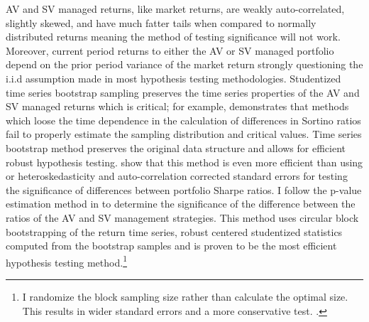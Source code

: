 AV and SV managed returns, like market returns, are weakly auto-correlated, slightly skewed, and have much fatter tails when compared to normally distributed returns meaning the \citet{memmel_performance_2003} method of testing significance will not work. Moreover, current period returns to either the AV or SV managed portfolio depend on the prior period variance of the market return strongly questioning the i.i.d assumption made in most hypothesis testing methodologies. Studentized time series bootstrap sampling preserves the time series properties of the AV and SV managed returns which is critical; for example, \citet{scherer_alternative_2004} demonstrates that methods which loose the time dependence in the calculation of differences in Sortino ratios fail to properly estimate the sampling distribution and critical values. Time series bootstrap method preserves the original data structure and allows for efficient robust hypothesis testing. \citep{politis_stationary_1994,davison1997bootstrap} \citet{ledoit_robust_2008} show that this method is even more efficient than using \citet{newey_simple_1987} or \citet{andrews_improved_1992} heteroskedasticity and auto-correlation corrected standard errors for testing the significance of differences between portfolio Sharpe ratios. I follow the p-value estimation method in \citet{ledoit_robust_2008} to determine the significance of the difference between the ratios of the AV and SV management strategies. This method uses circular block bootstrapping of the return time series, robust centered studentized statistics computed from the bootstrap samples and is proven to be the most efficient hypothesis testing method.\footnote{I randomize the block sampling size rather than calculate the optimal size. This results in wider standard errors and a more conservative test. \citep{lahiri_theoretical_1999}.} \citep{politis_general_1992,ledoit_robust_2008}

